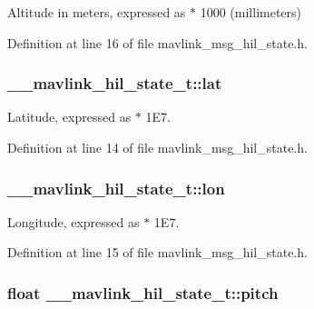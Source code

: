 Altitude in meters, expressed as $\ast$ 1000 (millimeters) 



Definition at line 16 of file mavlink\-\_\-msg\-\_\-hil\-\_\-state.\-h.

\hypertarget{struct____mavlink__hil__state__t_afb2b29710c1a8b69503e35a72473c6d3}{
\subsubsection[{lat}]{ \-\_\-\-\_\-mavlink\-\_\-hil\-\_\-state\-\_\-t\-::lat}}\label{struct____mavlink__hil__state__t_afb2b29710c1a8b69503e35a72473c6d3}


Latitude, expressed as $\ast$ 1\-E7. 



Definition at line 14 of file mavlink\-\_\-msg\-\_\-hil\-\_\-state.\-h.

\hypertarget{struct____mavlink__hil__state__t_aeac8427298a17d090889edf71a21c6ac}{
\subsubsection[{lon}]{ \-\_\-\-\_\-mavlink\-\_\-hil\-\_\-state\-\_\-t\-::lon}}\label{struct____mavlink__hil__state__t_aeac8427298a17d090889edf71a21c6ac}


Longitude, expressed as $\ast$ 1\-E7. 



Definition at line 15 of file mavlink\-\_\-msg\-\_\-hil\-\_\-state.\-h.

\hypertarget{struct____mavlink__hil__state__t_a734b8ba645687e5673c599c4a9a950f1}{
\subsubsection[{pitch}]{\setlength{\rightskip}{0pt plus 5cm}float \-\_\-\-\_\-mavlink\-\_\-hil\-\_\-state\-\_\-t\-::pitch}}\label{struct____mavlink__hil__state__t_a734b8ba645687e5673c599c4a9a950f1}


